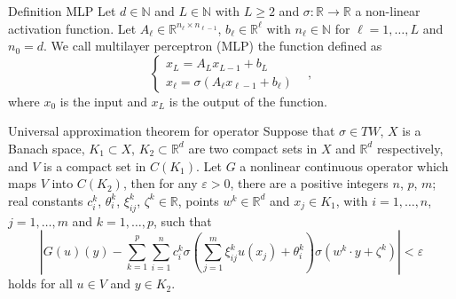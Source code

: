 \documentclass{beamer}
\newcommand{\numberset}{\mathbb}
\newcommand{\N}{\numberset{N}}
\newcommand{\R}{\numberset{R}}
\begin{document}

\begin{frame}[noframenumbering]{Definition MLP}
	Let $ d \in \N $ and $ L\in \N $ with $ L \ge 2 $ and $ \sigma : \R \to \R  $ a non-linear activation function. Let $ A_{\ell} \in \R^{n_{\ell}\times n_{\ell-1}} $, $ b_{\ell} \in \R^{\ell} $ with $ n_{\ell}\in \N $ for $ \ell = 1, \dots, L $	and $ n_{0} = d $. We call multilayer perceptron (MLP) the function defined as
	\[ \begin{cases}
		x_{L} = A_{L}x_{L-1} + b_{L} \qquad & \\
		x_{\ell} = \sigma\left( A_{\ell}x_{\ell-1} + b_{\ell} \right) 
	\end{cases}, \]
	where $ x_0 $ is the input and $ x_{L} $ is the output of the function.
\end{frame}


\begin{frame}[noframenumbering]{Universal approximation theorem for operator}
	Suppose that $ \sigma \in TW $, $ X $ is a Banach space, $ K_1 \subset X $, $ K_2 \subset \R^d $ are two compact sets in $ X $ and $ \R^{d} $ respectively, and $ V $ is a compact set in $ C(K_1) $. Let $ G $ a nonlinear continuous operator which maps $ V $ into $ C(K_2) $, then for any $ \varepsilon > 0 $, there are a positive integers $ n $, $ p $, $ m $; real constants $ c_i^{k}$, $ \theta_i^{k}$, $ \xi_{ij}^{k} $, $ \zeta^k \in \R $, points $ w^{k} \in \R^d $ and $ x_j \in K_1 $, with $ i = 1, \dots, n$, $ j = 1, \dots, m $ and $ k = 1, \dots, p $, such that
	\[ \left| G(u)(y) - \sum_{k=1}^{p}\sum_{i=1}^{n}c_i^k \sigma \left( \sum_{j=1}^{m} \xi_{ij}^k u(x_j) + \theta_i^k \right) \sigma(w^k \cdot y + \zeta^k) \right| < \varepsilon  \]
	holds for all $ u \in V $ and $ y \in K_2 $.
\end{frame}
\end{document}
